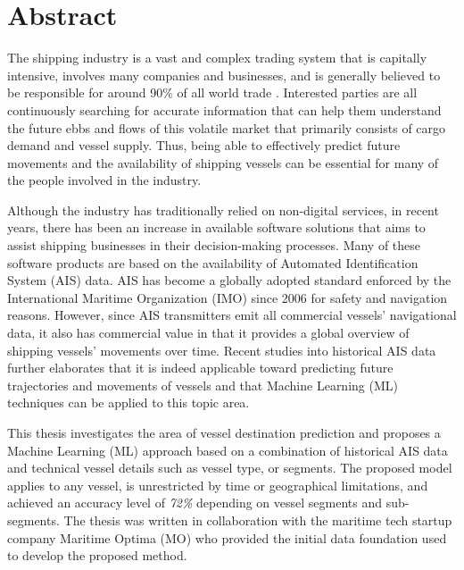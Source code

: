 \chapter*{Abstract}

The shipping industry is a vast and complex trading system that is capitally intensive, involves many companies and businesses, and is generally believed to be responsible for around 90\% of all world trade \parencite{GROTE2016511}. Interested parties are all continuously searching for accurate information that can help them understand the future ebbs and flows of this volatile market that primarily consists of cargo demand and vessel supply. Thus, being able to effectively predict future movements and the availability of shipping vessels can be essential for many of the people involved in the industry.

Although the industry has traditionally relied on non-digital services, in recent years, there has been an increase in available software solutions that aims to assist shipping businesses in their decision-making processes. Many of these software products are based on the availability of Automated Identification System (AIS) data. AIS has become a globally adopted standard enforced by the International Maritime Organization (IMO) since 2006 for safety and navigation reasons. However, since AIS transmitters emit all commercial vessels' navigational data, it also has commercial value in that it provides a global overview of shipping vessels' movements over time. Recent studies into historical AIS data further elaborates that it is indeed applicable toward predicting future trajectories and movements of vessels and that Machine Learning (ML) techniques can be applied to this topic area.

This thesis investigates the area of vessel destination prediction and proposes a Machine Learning (ML) approach based on a combination of historical AIS data and technical vessel details such as vessel type, or segments. The proposed model applies to any vessel, is unrestricted by time or geographical limitations, and achieved an accuracy level of \textit{72\%} depending on vessel segments and sub-segments. The thesis was written in collaboration with the maritime tech startup company Maritime Optima (MO) who provided the initial data foundation used to develop the proposed method.
